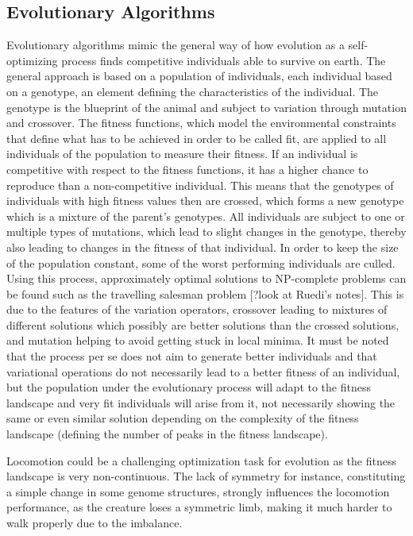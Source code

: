 \documentclass[main]{subfiles}
\begin{document}
\subsection{Evolutionary Algorithms}

Evolutionary algorithms mimic the general way of how evolution as a self-optimizing process finds competitive individuals able to survive on earth. The general approach is based on a population of individuals, each individual based on a genotype, an element defining the characteristics of the individual. The genotype is the blueprint of the animal and subject to variation through mutation and crossover. The fitness functions, which model the environmental constraints that define what has to be achieved in order to be called fit, are applied to all individuals of the population to measure their fitness. If an individual is competitive with respect to the fitness functions, it has a higher chance to reproduce than a non-competitive individual. This means that the genotypes of individuals with high fitness values then are crossed, which forms a new genotype which is a mixture of the parent's genotypes. All individuals are subject to one or multiple types of mutations, which lead to slight changes in the genotype, thereby also leading to changes in the fitness of that individual. In order to keep the size of the population constant, some of the worst performing individuals are culled. Using this process, approximately optimal solutions to NP-complete problems can be found such as the travelling salesman problem [?look at Ruedi's notes]. This is due to the features of the variation operators, crossover leading to mixtures of different solutions which possibly are better solutions than the crossed solutions, and mutation helping to avoid getting stuck in local minima. It must be noted that the process per se does not aim to generate better individuals and that variational operations do not necessarily lead to a better fitness of an individual, but the population under the evolutionary process will adapt to the fitness landscape and very fit individuals will arise from it, not necessarily showing the same or even similar solution depending on the complexity of the fitness landscape (defining the number of peaks in the fitness landscape). 

Locomotion could be a challenging optimization task for evolution as the fitness landscape is very non-continuous. The lack of symmetry for instance, constituting a simple change in some genome structures, strongly influences the locomotion performance, as the creature loses a symmetric limb, making it much harder to walk properly due to the imbalance.
\end{document}
